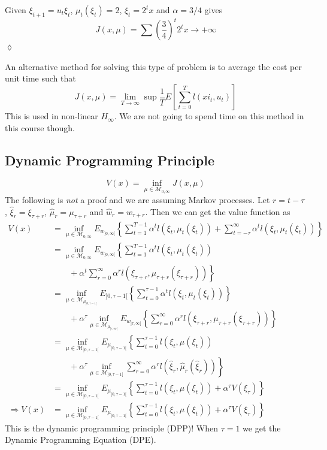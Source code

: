 \begin{example}
Given $\xi_{t+1}=u_t\xi_t$, $\mu_t(\xi_t)=2$, $\xi_t=2^tx$ and $\alpha=3/4$ gives
$$J(x,\mu) = \sum\left(\frac{3}{4}\right)^t2^tx\to+\infty$$
$\lozenge$
\end{example}

An alternative method for solving this type of problem is to average the cost per unit time such that
$$J(x,\mu) = \lim_{T\to\infty}\sup \frac{1}{T}E\left[\sum_{t=0}^Tl(xi_t,u_t)\right]$$
This is used in non-linear $H_\infty$. We are not going to spend time on this method in this course though.

\subsection{Dynamic Programming Principle}
$$V(x) = \inf_{\mu\in\mathcal{M}_{0,\infty}} J(x,\mu)$$
The following is \textit{not} a proof and we are assuming Markov processes. Let $r=t-\tau$, $\hat{\xi}_r=\xi_{\tau+r}$, $\hat{\mu}_r=\mu_{\tau+r}$ and $\hat{w}_r=w_{\tau+r}$. Then we can get the value function as
\begin{align}
V(x) &= \inf_{\mu\in\mathcal{M}_{0,\infty}} E_{w_{]0,\infty[}} \left\lbrace \sum_{t=1}^{T-1} \alpha^tl(\xi_t,\mu_t(\xi_t)) + \sum_{t=-\tau}^\infty \alpha^tl(\xi_t,\mu_t(\xi_t))\right\rbrace \nonumber \\
&= \inf_{\mu\in\mathcal{M}_{0,\infty}} E_{w_{]0,\infty[}} \left\lbrace \sum_{t=1}^{T-1} \alpha^tl(\xi_t,\mu_t(\xi_t)) \right. \nonumber \\
&\left. \qquad +  \alpha^t \sum_{r=0}^\infty \alpha^rl(\xi_{\tau+r},\mu_{\tau+r}(\xi_{\tau+r})) \right\rbrace \nonumber \\
&= \inf_{\mu\in\mathcal{M}_{\mu_{]0,\tau-1[}}} E_{]0,\tau-1[} \left\lbrace \sum_{t=0}^{\tau-1} \alpha^tl(\xi_t,\mu_t(\xi_t))\right\rbrace \nonumber \\
&\qquad + \alpha^\tau\inf_{\mu\in\mathcal{M}_{\mu_{]\tau,\infty[}}} E_{w_{]\tau,\infty[}} \left\lbrace \sum_{r=0}^\infty\alpha^rl(\xi_{\tau+r},\mu_{\tau+r}(\xi_{\tau+r}))\right\rbrace \nonumber \\
&= \inf_{\mu\in\mathcal{M}_{]0,\tau-1[}} E_{\mu_{]0,\tau-1[}} \left\lbrace \sum_{t=0}^{\tau-1} l(\xi_t,\mu(\xi_t)) \right. \nonumber \\
&\left. \qquad + \alpha^\tau \inf_{\mu\in\mathcal{M}_{]0,\tau-1[}} \sum_{r=0}^\infty \alpha^rl(\hat{\xi}_r,\hat{\mu}_r(\hat{\xi}_r)) \right\rbrace \nonumber \\
&= \inf_{\mu\in\mathcal{M}_{]0,\tau-1[}} E_{\mu_{]0,\tau-1[}} \left\lbrace \sum_{t=0}^{\tau-1} l(\xi_t,\mu(\xi_t)) + \alpha^\tau V(\xi_\tau) \right\rbrace \nonumber \nonumber \\
\Rightarrow V(x) &= \inf_{\mu\in\mathcal{M}_{]0,\tau-1[}} E_{\mu_{]0,\tau-1[}} \left\lbrace \sum_{t=0}^{\tau-1} l(\xi_t,\mu(\xi_t)) + \alpha^\tau V(\xi_\tau) \right\rbrace
\end{align}
This is the dynamic programming principle (DPP)! When $\tau=1$ we get the Dynamic Programming Equation (DPE).

